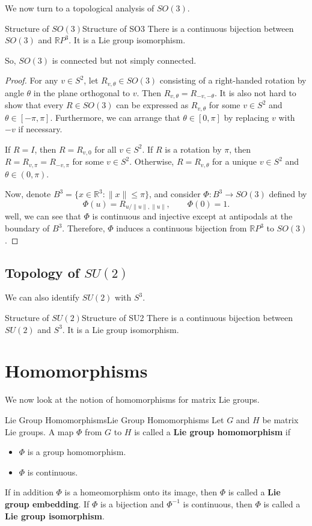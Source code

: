 \documentclass[../main.tex]{subfiles}
\begin{document}
We now turn to a topological analysis of $SO(3)$.
\begin{proposition}{Structure of $SO(3)$}{Structure of SO3}
	There is a continuous bijection between $SO(3)$ and $\mathbb{R}P^3$. It is a Lie group isomorphism.

	So, $SO(3)$ is connected but not simply connected.
\end{proposition}
\begin{proof}
	For any $v \in S^2$, let $R_{v, \theta} \in SO(3)$ consisting of a right-handed rotation by angle $\theta$ in the plane orthogonal to $v$. Then $R_{v, \theta} = R_{-v, -\theta}$. It is also not hard to show that every $R \in SO(3)$ can be expressed as $R_{v, \theta}$ for some $v \in S^2$ and $\theta \in [-\pi, \pi]$. Furthermore, we can arrange that $\theta \in [0, \pi]$ by replacing $v$ with $-v$ if necessary.

	If $R = I$, then $R = R_{v, 0}$ for all $v \in S^2$. If $R$ is a rotation by $\pi$, then $R = R_{v, \pi} = R_{-v, \pi}$ for some $v \in S^2$. Otherwise, $R = R_{v, \theta}$ for a unique $v \in S^2$ and $\theta \in (0, \pi)$.

	Now, denote $B^3 = \{ x \in \mathbb{R}^3 : \|x\| \leq \pi \}$, and consider $\Phi: B^3 \to SO(3)$ defined by
	\begin{equation}
		\Phi(u) = R_{u/\|u\|, \|u\|}, \qquad \Phi(0) = 1.
	\end{equation}
	well, we can see that $\Phi$ is continuous and injective except at antipodals at the boundary of $B^3$. Therefore, $\Phi$ induces a continuous bijection from $\mathbb{R}P^3$ to $SO(3)$.
\end{proof}

\subsection{Topology of $SU(2)$}

We can also identify $SU(2)$ with $S^3$.
\begin{proposition}{Structure of $SU(2)$}{Structure of SU2}
	There is a continuous bijection between $SU(2)$ and $S^3$. It is a Lie group isomorphism.
\end{proposition}

\section{Homomorphisms}
We now look at the notion of homomorphisms for matrix Lie groups.

\begin{definition}{Lie Group Homomorphisms}{Lie Group Homomorphisms}
	Let $G$ and $H$ be matrix Lie groups. A map $\Phi$ from $G$ to $H$ is called a \textbf{Lie group homomorphism} if
	\begin{itemize}
		\item $\Phi$ is a group homomorphism.
		\item $\Phi$ is continuous.
	\end{itemize}
	If in addition $\Phi$ is a homeomorphism onto its image, then $\Phi$ is called a \textbf{Lie group embedding}. If $\Phi$ is a bijection and $\Phi^{-1}$ is continuous, then $\Phi$ is called a \textbf{Lie group isomorphism}.
\end{definition}
\end{document}
